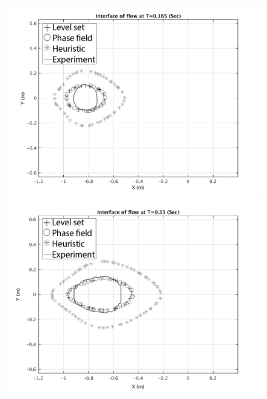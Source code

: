 \documentclass[letterpaper,10pt]{article}
\begin{document}
\begin{figure}[H]
        \begin{minipage}[b]{.5\linewidth}
                \centering                
                \includegraphics[width=1\textwidth]{IMAGES/interface165.png}                
                \includegraphics[width=1\textwidth]{IMAGES/interface330.png}
              

\end{minipage}
\end{figure}
\end{document}
